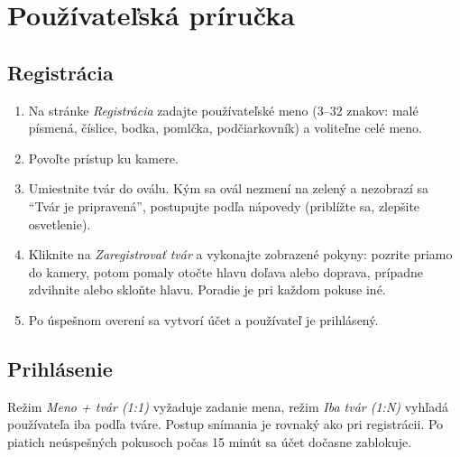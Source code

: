 \section{Používateľská príručka}

\subsection*{Registrácia}
\begin{enumerate}
  \item Na stránke \emph{Registrácia} zadajte používateľské meno (3--32 znakov: malé
        písmená, číslice, bodka, pomlčka, podčiarkovník) a voliteľne celé meno.
  \item Povoľte prístup ku kamere.
  \item Umiestnite tvár do oválu. Kým sa ovál nezmení na zelený a nezobrazí sa
        \enquote{Tvár je pripravená}, postupujte podľa nápovedy (priblížte sa, zlepšite
        osvetlenie).
  \item Kliknite na \emph{Zaregistrovať tvár} a vykonajte zobrazené pokyny:
        pozrite priamo do kamery, potom pomaly otočte hlavu doľava alebo doprava,
        prípadne zdvihnite alebo skloňte hlavu. Poradie je pri každom pokuse iné.
  \item Po úspešnom overení sa vytvorí účet a používateľ je prihlásený.
\end{enumerate}

\subsection*{Prihlásenie}
Režim \emph{Meno + tvár (1:1)} vyžaduje zadanie mena, režim \emph{Iba tvár (1:N)}
vyhľadá používateľa iba podľa tváre. Postup snímania je rovnaký ako pri registrácii.
Po piatich neúspešných pokusoch počas 15 minút sa účet dočasne zablokuje.

